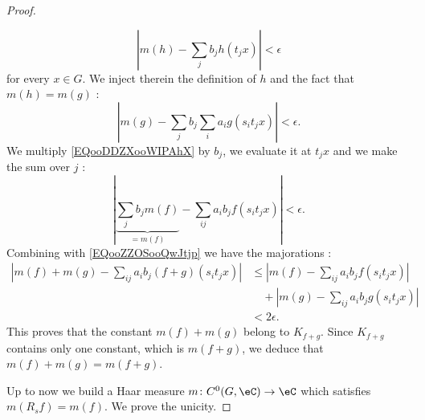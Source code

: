 \begin{proof}
\begin{subproof}
            \begin{equation}
                | m(h)-\sum_{j}b_jh(t_jx) |<\epsilon
            \end{equation}
            for every \( x\in G\). We inject therein the definition of \( h\) and the fact that \( m(h)=m(g)\) :
            \begin{equation}        \label{EQooZZOSooQwJtjp}
                | m(g)-\sum_jb_j\sum_ia_ig(s_it_jx) |<\epsilon.
            \end{equation}
            We multiply \eqref{EQooDDZXooWIPAhX} by \( b_j\), we evaluate it at \(t_jx\) and we make the sum over \( j\) :
            \begin{equation}
                | \underbrace{\sum_jb_jm(f)}_{=m(f)}-\sum_{ij}a_ib_jf(s_it_jx) |<\epsilon.
            \end{equation}
            Combining with \eqref{EQooZZOSooQwJtjp} we have the majorations :
            \begin{subequations}
                \begin{align}
                    | m(f)+m(g)-\sum_{ij}a_ib_j(f+g)(s_it_jx) |&\leq | m(f)-\sum_{ij}a_ib_jf(s_it_jx) |\\
                                                                &\quad+| m(g)-\sum_{ij}a_ib_jg(s_it_jx) |   \nonumber\\
                    &<2\epsilon.
                \end{align}
            \end{subequations}
            This proves that the constant \( m(f)+m(g)\) belong to \( K_{f+g}\). Since \( K_{f+g}\) contains only one constant, which is \( m(f+g)\), we deduce that \( m(f)+m(g)=m(f+g)\).
    \end{subproof}
    Up to now we build a Haar measure \( m\colon C^0(G,\eC)\to \eC\) which satisfies \( m(R_sf)=m(f)\). We prove the unicity. 


\end{proof}

